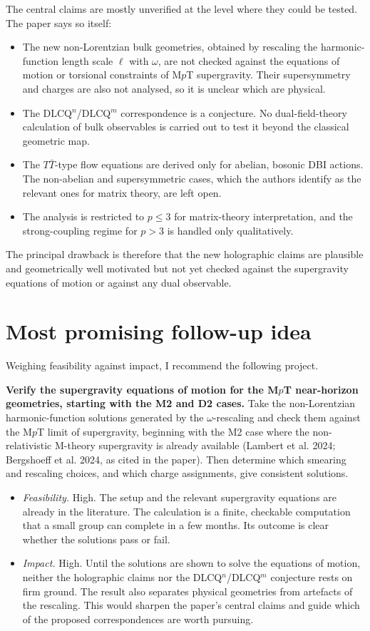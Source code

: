 \documentclass[11pt]{article}
\begin{document}
The central claims are mostly unverified at the level where they could be tested. The paper says so itself:
\begin{itemize}[leftmargin=*]
\item The new non-Lorentzian bulk geometries, obtained by rescaling the harmonic-function length scale $\ell$ with $\omega$, are not checked against the equations of motion or torsional constraints of M$p$T supergravity. Their supersymmetry and charges are also not analysed, so it is unclear which are physical.
\item The DLCQ$^n$/DLCQ$^m$ correspondence is a conjecture. No dual-field-theory calculation of bulk observables is carried out to test it beyond the classical geometric map.
\item The $T\bar T$-type flow equations are derived only for abelian, bosonic DBI actions. The non-abelian and supersymmetric cases, which the authors identify as the relevant ones for matrix theory, are left open.
\item The analysis is restricted to $p\le 3$ for matrix-theory interpretation, and the strong-coupling regime for $p>3$ is handled only qualitatively.
\end{itemize}
The principal drawback is therefore that the new holographic claims are plausible and geometrically well motivated but not yet checked against the supergravity equations of motion or against any dual observable.

\section{Most promising follow-up idea}

Weighing feasibility against impact, I recommend the following project.

\textbf{Verify the supergravity equations of motion for the M$p$T near-horizon geometries, starting with the M2 and D2 cases.} Take the non-Lorentzian harmonic-function solutions generated by the $\omega$-rescaling and check them against the M$p$T limit of supergravity, beginning with the M2 case where the non-relativistic M-theory supergravity is already available (Lambert et al. 2024; Bergshoeff et al. 2024, as cited in the paper). Then determine which smearing and rescaling choices, and which charge assignments, give consistent solutions.

\begin{itemize}[leftmargin=*]
\item \emph{Feasibility.} High. The setup and the relevant supergravity equations are already in the literature. The calculation is a finite, checkable computation that a small group can complete in a few months. Its outcome is clear whether the solutions pass or fail.
\item \emph{Impact.} High. Until the solutions are shown to solve the equations of motion, neither the holographic claims nor the DLCQ$^n$/DLCQ$^m$ conjecture rests on firm ground. The result also separates physical geometries from artefacts of the rescaling. This would sharpen the paper's central claims and guide which of the proposed correspondences are worth pursuing.
\end{itemize}
\end{document}

